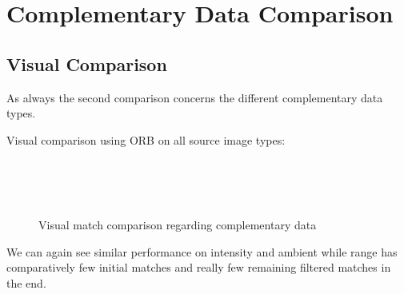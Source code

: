 \section{Complementary Data Comparison}{
    \subsection{Visual Comparison}{
        As always the second comparison concerns the different complementary data types.

        Visual comparison using ORB on all source image types:

        \begin{figure}[htp]
            \centering
            \\
            \\
            \\
            \caption{Visual match comparison regarding complementary data}
            \label{fig:match_comparison_sources}
        \end{figure}

        We can again see similar performance on intensity and ambient while range has comparatively few initial matches and really few remaining filtered matches in the end.
    }
}
